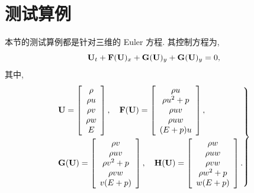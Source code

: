\section{测试算例}
\label{sec:numerical-parallel}

本节的测试算例都是针对三维的 Euler 方程. 其控制方程为,
\begin{equation}
  \label{eq:3d-euler-eq}
  {\bf{U}}_{t} + {\bf{F}}({\bf{U}})_{x} + {\bf{G}}({\bf{U}})_{y}
  + {\bf{G}}({\bf{U}})_{y} = 0,
\end{equation}
其中,
\begin{equation}
  \label{eq:3d-euler-eq-notation}
  \left.
    \begin{aligned}
      &{\bf{U}} = \left[
        \begin{array}{c}
          \rho\\
          \rho u\\
          \rho v\\
          \rho w\\
          E
        \end{array}
      \right], \quad
      {\bf{F}}({\bf{U}}) = \left[
        \begin{array}{c}
          \rho u\\
          \rho u^{2} + p\\
          \rho uv \\
          \rho uw \\
          (E+p) u
        \end{array}
      \right],\\
      &{\bf{G}}({\bf{U}}) = \left[
        \begin{array}{c}
          \rho v\\
          \rho u v\\
          \rho v^{2} + p\\
          \rho v w\\
          v (E + p)
        \end{array}
      \right], \quad
      {\bf{H}}({\bf{U}}) = \left[
        \begin{array}{c}
          \rho w\\
          \rho u w\\
          \rho v w\\
          \rho w^{2} + p\\
          w (E + p)
        \end{array}
      \right].
    \end{aligned}
  \right\}
\end{equation}

